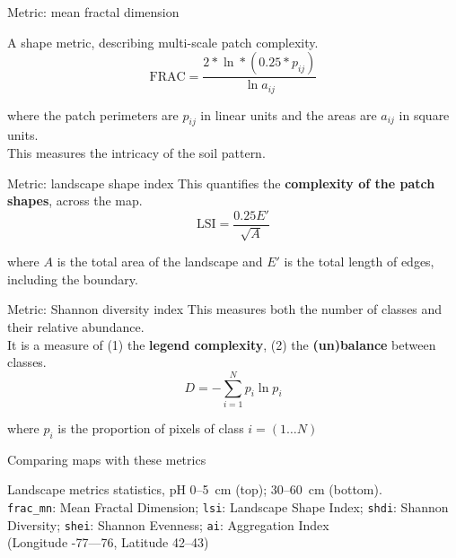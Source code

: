 \documentclass[aspectratio=169, 10pt]{beamer}
\begin{document}
\begin{frame}{Metric: mean fractal dimension}

A shape metric, describing multi-scale patch complexity.
$$\mathrm{FRAC} = \frac{2 * \ln * (0.25 * p_{ij})} {\ln a_{ij}}$$ 

where the patch perimeters are ${p_{ij}}$ in linear units and the areas are ${a_{ij}}$ in square units.
\\
This measures the intricacy of the soil pattern.

\end{frame}

\begin{frame}{Metric: landscape shape index}
    This quantifies the \textbf{complexity of the patch shapes}, across the map.
    $$   \mathrm{LSI} = \frac{0.25 E'}{\sqrt{A}}$$

    where $A$ is the total area of the landscape and $E'$ is the total length of edges, including the boundary.
\end{frame}

\begin{frame}{Metric: Shannon diversity index}
  This measures both the number of classes and their relative abundance.\\
  It is a measure of (1) the \textbf{legend complexity}, (2) the \textbf{(un)balance} between classes.
    $$ D = - \sum_{i=1}^N p_i \ln p_i$$

    where $p_i$ is the proportion of pixels of class $i = (1 \ldots N)$
\end{frame}

\begin{frame}{Comparing maps with these metrics}
\par
    
    \par
    \begin{footnotesize}
      Landscape metrics statistics, pH 0--5~cm (top); 30--60~cm (bottom).
      \\
      \texttt{frac\_mn}: Mean Fractal Dimension; \texttt{lsi}: Landscape Shape Index; \texttt{shdi}: Shannon Diversity; \texttt{shei}: Shannon Evenness; \texttt{ai}: Aggregation Index\\
      (Longitude -77---76\textdegree, Latitude 42--43\textdegree)
    \end{footnotesize}
\end{frame}
\end{document}
